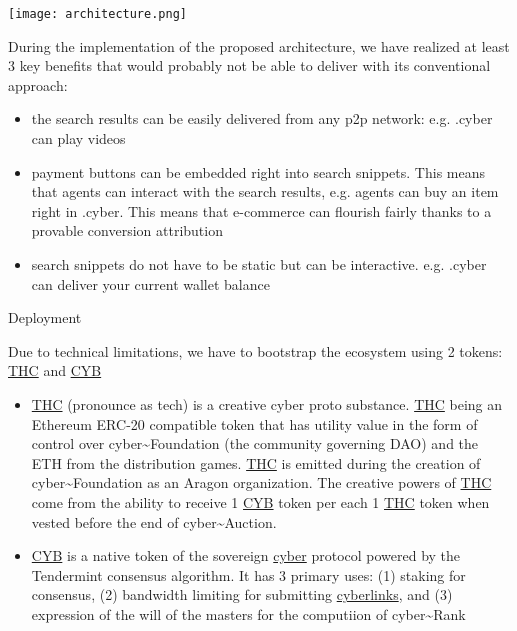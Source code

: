 \documentclass[8pt,oneside]{amsart}
\makeatletter
\newcommand{\linkred}[2]{\href{#1}{\color{red}{#2}}}
\renewcommand\subsection{\@startsection{subsection}
                                    {2}{\z@}
                                    {-3.25ex\@plus -1ex \@minus -.2ex}
                                    {0ex \@plus .2ex}
                                    {\play\Large}
                        }
\newcommand{\titleSection}[1]{\subsection{#1}}
\newenvironment{Figure}
  {\par\medskip\noindent\minipage{\linewidth}}
  {\endminipage\par\medskip}
\makeatother
\begin{document}
\begin{Figure}
    \centering
    \texttt{[image: architecture.png]}
\end{Figure}

During the implementation of the proposed architecture, we have realized at least 3 key benefits that \linkred{https://google.com}{Google} would probably not be able to deliver with its conventional approach:

\begin{itemize}
\item the search results can be easily delivered from any p2p network: e.g. .cyber can play videos
\item payment buttons can be embedded right into search snippets. This means that agents can interact with the search results, e.g. agents can buy an item right in .cyber. This means that e-commerce can flourish fairly thanks to a provable conversion attribution
\item search snippets do not have to be static but can be interactive. e.g. .cyber can deliver your current wallet balance
\end{itemize}

\titleSection{Deployment}\label{deployment}

Due to technical limitations, we have to bootstrap the ecosystem using 2 tokens: {\hyperref[thc]{THC}} and {\hyperref[cyb]{CYB}}

\begin{itemize}
\item {\hyperref[thc]{THC}} (pronounce as tech) is a creative cyber proto substance. {\hyperref[thc]{THC}} being an Ethereum ERC-20 compatible token that has utility value in the form of control over cyber\~{}Foundation (the community governing DAO) and the ETH from the distribution games. {\hyperref[thc]{THC}} is emitted during the creation of cyber\~{}Foundation as an Aragon organization. The creative powers of {\hyperref[thc]{THC}} come from the ability to receive 1 {\hyperref[cyb]{CYB}} token per each 1 {\hyperref[thc]{THC}} token when vested before the end of cyber\~{}Auction.
\item {\hyperref[cyb]{CYB}} is a native token of the sovereign {\hyperref[cyber]{cyber}} protocol powered by the Tendermint consensus algorithm. It has 3 primary uses: (1) staking for consensus, (2) bandwidth limiting for submitting {\hyperref[cyberlinks]{cyberlinks}}, and (3) expression of the will of the masters for the computiion of cyber\~{}Rank
\end{itemize}
\end{document}

